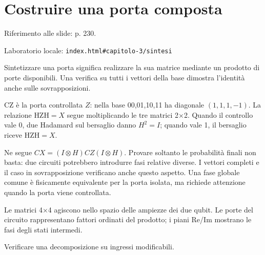 \section{Costruire una porta composta}
\label{c3-sintesi}

{\sffamily\small\color{Ink!70} Riferimento alle slide: p. 230.\par}

{\sffamily\small\color{Ink!70} Laboratorio locale: \nolinkurl{index.html#capitolo-3/sintesi}\par}

Sintetizzare una porta significa realizzare la sua matrice mediante un prodotto di porte disponibili. Una verifica su tutti i vettori della base dimostra l'identità anche sulle sovrapposizioni.\par

CZ è la porta controllata \(Z\): nella base 00,01,10,11 ha diagonale \((1{,}1{,}1,\allowbreak - 1)\). La relazione \(\text{HZH}=X\) segue moltiplicando le tre matrici 2\(\times\)2. Quando il controllo vale 0, due Hadamard sul bersaglio danno \(H^{2}=I\); quando vale 1, il bersaglio riceve \(\text{HZH}=X\).\par

Ne segue \(CX=(I\otimes H)CZ(I\otimes H)\). Provare soltanto le probabilità finali non basta: due circuiti potrebbero introdurre fasi relative diverse. I vettori completi e il caso in sovrapposizione verificano anche questo aspetto. Una fase globale comune è fisicamente equivalente per la porta isolata, ma richiede attenzione quando la porta viene controllata.\par



Le matrici 4\(\times\)4 agiscono nello spazio delle ampiezze dei due qubit. Le porte del circuito rappresentano fattori ordinati del prodotto; i piani Re/Im mostrano le fasi degli stati intermedi.\par



Verificare una decomposizione su ingressi modificabili.\par

